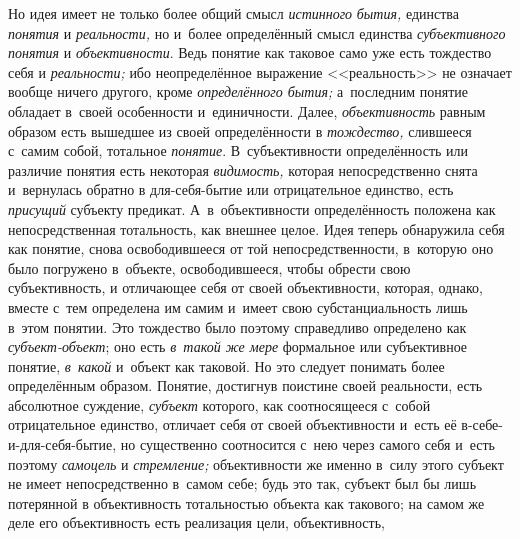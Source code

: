 Но идея имеет не только более общий смысл {\em истинного} {\em бытия,} единства
{\em понятия} и {\em реальности,} но и~более определённый смысл единства
{\em субъективного понятия} и {\em объективности}. Ведь понятие как таковое
само уже есть тождество себя и {\em реальности;} ибо неопределённое выражение
<<реальность>> не означает вообще ничего другого, кроме {\em определённого
бытия;} а~последним понятие обладает в~своей особенности и~единичности. Далее,
{\em объективность} равным образом есть вышедшее из своей определённости
в {\em тождество,} слившееся с~самим собой, тотальное {\em понятие}.
В~субъективности определённость или различие понятия есть некоторая
{\em видимость,} которая непосредственно снята и~вернулась обратно
в для-себя-бытие или отрицательное единство, есть {\em присущий} субъекту
предикат. А~в~объективности определённость положена как непосредственная
тотальность, как внешнее целое. Идея теперь обнаружила себя как понятие,
снова освободившееся от той непосредственности, в~которую оно было
погружено в~объекте, освободившееся, чтобы обрести свою субъективность, и
отличающее себя от своей объективности, которая, однако, вместе с~тем
определена им самим и~имеет свою субстанциальность лишь в~этом понятии. Это
тождество было поэтому справедливо определено как
{\em субъект-объект}; оно есть {\em в~такой же
мере} формальное или субъективное понятие,
{\em в~какой} и~объект
как таковой. Но это следует понимать более определённым образом. Понятие,
достигнув поистине своей реальности, есть абсолютное суждение,
{\em субъект} которого,
как соотносящееся с~собой отрицательное единство, отличает
себя от своей объективности и~есть её в-себе-и-для-себя-бытие, но
существенно соотносится с~нею через самого себя и~есть поэтому
{\em самоцель} и {\em стремление;}
объективности же именно в~силу этого субъект не имеет
непосредственно в~самом себе; будь это так, субъект был бы лишь потерянной
в объективность тотальностью объекта как такового; на самом же деле его
объективность есть реализация цели, объективность,
